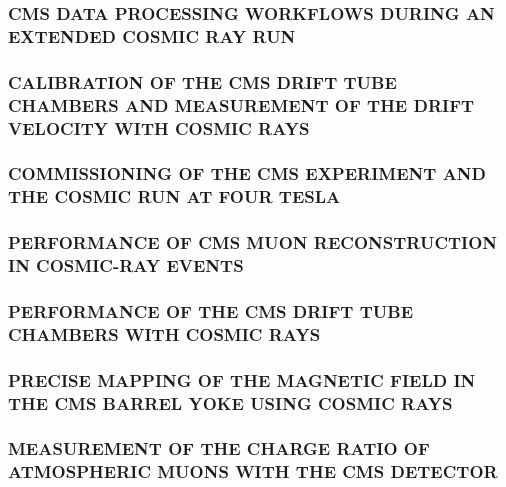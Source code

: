 \documentclass[a4paper, 11pt, twoside, openright]{report}
\begin{document}
\subsubsection{CMS DATA PROCESSING WORKFLOWS DURING AN EXTENDED COSMIC RAY RUN}
%
\subsubsection{CALIBRATION OF THE CMS DRIFT TUBE CHAMBERS AND MEASUREMENT OF THE DRIFT VELOCITY WITH COSMIC RAYS}
%
\subsubsection{COMMISSIONING OF THE CMS EXPERIMENT AND THE COSMIC RUN AT FOUR TESLA}
%
\subsubsection{PERFORMANCE OF CMS MUON RECONSTRUCTION IN COSMIC-RAY EVENTS}
%
\subsubsection{PERFORMANCE OF THE CMS DRIFT TUBE CHAMBERS WITH COSMIC RAYS}
%
\subsubsection{PRECISE MAPPING OF THE MAGNETIC FIELD IN THE CMS BARREL YOKE USING COSMIC RAYS}
%
\subsubsection{MEASUREMENT OF THE CHARGE RATIO OF ATMOSPHERIC MUONS WITH THE CMS DETECTOR}
%
\end{document}
